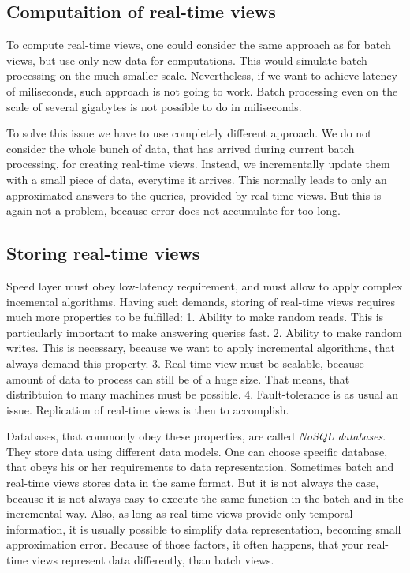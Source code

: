 \subsection{Computaition of real-time views}
To compute real-time views, one could consider the same approach as for batch
views, but use only new data for computations.
This would simulate batch processing on the much smaller scale.
Nevertheless, if we want to achieve latency of miliseconds, such approach is
not going to work.
Batch processing even on the scale of several gigabytes is not possible to do in
miliseconds.

To solve this issue we have to use completely different approach.
We do not consider the whole bunch of data, that has arrived during current
batch processing, for creating real-time views.
Instead, we incrementally update them with a small piece of data, everytime it
arrives.
This normally leads to only an approximated answers to the queries, provided by
real-time views.
But this is again not a problem, because error does not accumulate for too long.

\subsection{Storing real-time views}
Speed layer must obey low-latency requirement, and must allow to apply complex
incemental algorithms.
Having such demands, storing of real-time views requires much more properties
to be fulfilled:
1. Ability to make random reads. This is particularly important to make
answering queries fast.
2. Ability to make random writes. This is necessary, because we want to apply
incremental algorithms, that always demand this property.
3. Real-time view must be scalable, because amount of data to process can still
be of a huge size. That means, that distribtuion to many machines must be
possible.
4. Fault-tolerance is as usual an issue. Replication of real-time views is then
to accomplish.

Databases, that commonly obey these properties, are called \textit{NoSQL databases}.
They store data using different data models.
One can choose specific database, that obeys his or her requirements to data
representation.
Sometimes batch and real-time views stores data in the same format.
But it is not always the case, because it is not always easy to execute the
same function in the batch and in the incremental way.
Also, as long as real-time views provide only temporal information, it is
usually possible to simplify data representation, becoming small approximation
error.
Because of those factors, it often happens, that your real-time views represent
data differently, than batch views.

